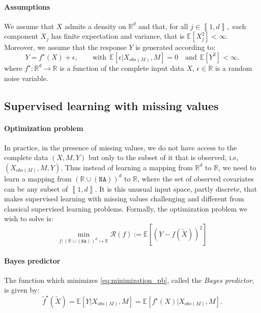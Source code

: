 \documentclass{article}
\newcommand{\RR}{\mathbb{R}}
\newcommand{\E}{\mathbb{E}}
\newcommand{\Rcal}{\mathcal{R}}
\newcommand{\NA}{\mathtt{NA}}
\newcommand{\br}[1]{\left(#1\right)}
\newcommand{\sqb}[1]{\left[#1\right]}
\newcommand{\bbr}[1]{\left\llbracket#1\right\rrbracket}
\theoremstyle{plain}
\begin{document}
\paragraph{Assumptions} We assume that $X$ admits a density on $\RR^d$ and that, for all $j \in \bbr{1, d},$ each component $X_j$ has finite expectation and variance, that is $ \E\sqb{X_j^2}<\infty$.  Moreover, we assume that the response $Y$ is generated according to:
\begin{equation}
    \label{eq:generation}
    Y = f^\star(X) + \epsilon, \qquad \textrm{with}~~\E\sqb{\epsilon|X_{obs(M)}, M} = 0 \quad \textrm{and}~~\E\sqb{Y^2} < \infty.
\end{equation}%
where $f^\star: \RR^d \to \RR$ is a function of the complete input data $X$, $\epsilon \in \RR$ is a random noise variable.

\subsection{Supervised learning with missing values}
\paragraph{Optimization problem} In practice, in the presence of missing values, we do not have access to the complete data $(X, M, Y)$ but only to the subset of it that is observed, i.e, $(X_{obs(M)}, M, Y)$. Thus instead of learning a mapping from $\RR^d$ to $\RR$, we need to learn a mapping from $\br{\RR \cup \br{\NA}}^d$ to $\RR$, where the set of observed covariates can be any subset of $\bbr{1, d}$. It is this unusual input space, partly discrete, that makes supervised learning with missing values challenging and different from classical supervised learning problems. Formally, the optimization problem we wish to solve is:
\begin{equation}
    \label{eq:minimization_pb}
    \min_{f: \br{\RR \cup \br{\NA}}^d \mapsto \RR} \Rcal(f):= \E\sqb{\br{Y - f(\widetilde X)}^2}
\end{equation}


\paragraph{Bayes predictor} The function which minimizes \eqref{eq:minimization_pb}, called the \emph{Bayes predictor}, is given by:
\begin{equation}
    \tilde{f}^{\star}(\widetilde X) = \E \sqb{Y | X_{obs(M)}, M}
     = \E \sqb{f^\star(X) | X_{obs(M)}, M}. \label{eq:BP}
\end{equation}
\end{document}
